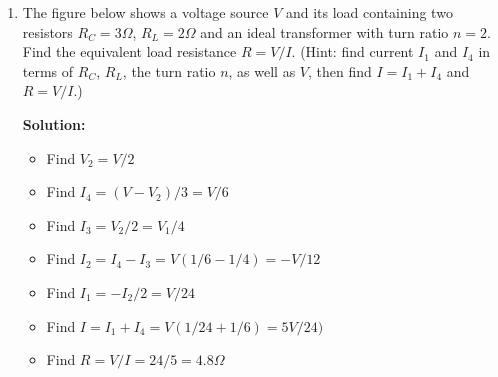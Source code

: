 \begin{enumerate}

 {\bf Solution:}
 \begin{itemize}
 \item Convert the $Y$ containing three $1\Omega$ resistors in the circuit 
 into a delta with three $1/3\Omega$ resistors.
 \item Get the T-model of the system with $Z_1=Z_2=1/3$, $Z_3=4/3$.
 \item Convert the T-model into a Z-network with
 \[ Z_{11}=Z_1+Z_3=5/3,\;\;\;\;Z_{22}=Z_2+Z_3=5/3,
 	\;\;\;\;Z_{12}=Z_{21}=Z_3=4/3 \]
 \item Find ${\bf Y}$:
 \[ {\bf Y}={\bf Z}^{-1}=\frac{1}{3}\left[ \begin{array}{rr}
 	5 & 4 \\ 4 & 5 \end{array} \right]^{-1}
 	=\frac{1}{3}\left[ \begin{array}{rr} 5 & -4 \\ -4 & 5 \end{array} \right]
 \]
 	with $Y_{11}=Y_{22}=5/3$, $Y_{12}=Y_{21}=-4/3$.
 \item Convert the Y-model to a $\Pi$-network:
 \[ Y_1=Y_{11}+Y_{12}=1/3,\;\;\;\;Y_2=Y_{22}+Y_{21}=1/3,\;\;\;\;Y_3=-Y_{12}=4/3 \]
 \item The $\Pi$-model can be also expressed In terms of impedances:
 \[ Z_1=3,\;\;\;\;Z_2=3,\;\;\;\;Z_3=4/3 \]
 \end{itemize}
 As both ${\bf Z}$ and ${\bf Y}$ are symmetric, the system is reciprocal.

\item The figure below shows a voltage source $V$ and its load containing
two resistors $R_C=3\Omega$, $R_L=2\Omega$ and an ideal transformer with 
turn ratio $n=2$. Find the equivalent load resistance $R=V/I$.
(Hint: find current $I_1$ and $I_4$ in terms of $R_C$, $R_L$, the turn 
ratio $n$, as well as $V$, then find $I=I_1+I_4$ and $R=V/I$.)


 {\bf Solution:}
 
 \begin{itemize}
 \item Find $V_2=V/2$
 \item Find $I_4=(V-V_2)/3=V/6$
 \item Find $I_3=V_2/2=V_1/4$
 \item Find $I_2=I_4-I_3=V(1/6-1/4)=-V/12$
 \item Find $I_1=-I_2/2=V/24$
 \item Find $I=I_1+I_4=V(1/24+1/6)=5V/24)$
 \item Find $R=V/I=24/5=4.8\Omega$
 \end{itemize}


\end{enumerate}
